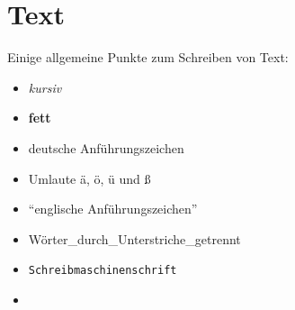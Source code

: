 \chapter{Text}

Einige allgemeine Punkte zum Schreiben von Text:

\begin{itemize}
 \item \textit{kursiv}
 \item \textbf{fett}
 \item \glqq{}deutsche Anführungszeichen\grqq{}
 \item Umlaute ä, ö, ü und ß
 \item ``englische Anführungszeichen''
 \item Wörter\_durch\_Unterstriche\_getrennt
 \item \texttt{Schreibmaschinenschrift}
 \item {}
\end{itemize}